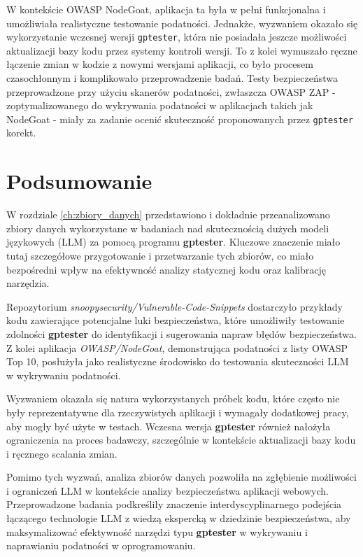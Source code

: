 W kontekście OWASP NodeGoat, aplikacja ta była w pełni funkcjonalna i umożliwiała realistyczne testowanie podatności. Jednakże, wyzwaniem okazało się wykorzystanie wczesnej wersji \texttt{gptester}, która nie posiadała jeszcze możliwości aktualizacji bazy kodu przez systemy kontroli wersji. To z kolei wymuszało ręczne łączenie zmian w kodzie z nowymi wersjami aplikacji, co było procesem czasochłonnym i komplikowało przeprowadzenie badań. Testy bezpieczeństwa przeprowadzone przy użyciu skanerów podatności, zwłaszcza OWASP ZAP - zoptymalizowanego do wykrywania podatności w aplikacjach takich jak NodeGoat - miały za zadanie ocenić skuteczność proponowanych przez \texttt{gptester} korekt.


\section{Podsumowanie}

W rozdziale \ref{ch:zbiory_danych} przedstawiono i dokładnie przeanalizowano zbiory danych wykorzystane w badaniach nad skutecznością dużych modeli językowych (LLM) za pomocą programu \textbf{gptester}. Kluczowe znaczenie miało tutaj szczegółowe przygotowanie i przetwarzanie tych zbiorów, co miało bezpośredni wpływ na efektywność analizy statycznej kodu oraz kalibrację narzędzia.

Repozytorium \textit{snoopysecurity/Vulnerable-Code-Snippets} dostarczyło przykłady kodu zawierające potencjalne luki bezpieczeństwa, które umożliwiły testowanie zdolności \textbf{gptester} do identyfikacji i sugerowania napraw błędów bezpieczeństwa. Z kolei aplikacja \textit{OWASP/NodeGoat}, demonstrująca podatności z listy OWASP Top 10, posłużyła jako realistyczne środowisko do testowania skuteczności LLM w wykrywaniu podatności.

Wyzwaniem okazała się natura wykorzystanych próbek kodu, które często nie były reprezentatywne dla rzeczywistych aplikacji i wymagały dodatkowej pracy, aby mogły być użyte w testach. Wczesna wersja \textbf{gptester} również nałożyła ograniczenia na proces badawczy, szczególnie w kontekście aktualizacji bazy kodu i ręcznego scalania zmian.

Pomimo tych wyzwań, analiza zbiorów danych pozwoliła na zgłębienie możliwości i ograniczeń LLM w kontekście analizy bezpieczeństwa aplikacji webowych. Przeprowadzone badania podkreśliły znaczenie interdyscyplinarnego podejścia łączącego technologie LLM z wiedzą ekspercką w dziedzinie bezpieczeństwa, aby maksymalizować efektywność narzędzi typu \textbf{gptester} w wykrywaniu i naprawianiu podatności w oprogramowaniu.
